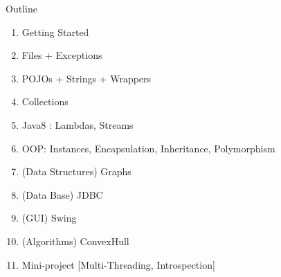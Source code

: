\documentclass[English,t,%
hyperref={%
    pdftitle={FISA-DE2 OOP in Java},%
    pdfauthor={Guillaume Muller},%
    pdfsubject={OOP in Java},%
    pdfkeywords={OOP, Java}%
    },%
xcolor={pdftex,svgnames} %
]{beamer}
\begin{document}
\begin{frame}{Outline}

  \begin{enumerate}
    \item Getting Started
    \item Files + Exceptions
    \item POJOs + Strings + Wrappers
    \item Collections
    \item Java8 : Lambdas, Streams
    \item OOP: Instances, Encapsulation, Inheritance, Polymorphism
    \item (Data Structures) Graphs
    \item (Data Base) JDBC
    \item (GUI) Swing
    \item (Algorithms) ConvexHull
    \item Mini-project [Multi-Threading, Introspection]
  \end{enumerate}

\end{frame}
\end{document}
